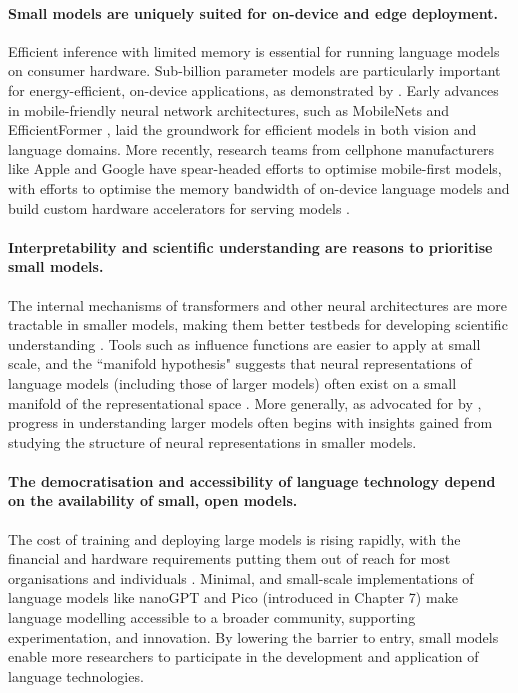 \paragraph{Small models are uniquely suited for on-device and edge deployment.} Efficient inference with limited memory is essential for running language models on consumer hardware. Sub-billion parameter models are particularly important for energy-efficient, on-device applications, as demonstrated by \citet{liu2024mobilellm}. Early advances in mobile-friendly neural network architectures, such as MobileNets \citep{howard2017mobilenets} and EfficientFormer \citep{li2022efficientformer}, laid the groundwork for efficient models in both vision and language domains. More recently, research teams from cellphone manufacturers like Apple and Google have spear-headed efforts to optimise mobile-first models, with efforts to optimise the memory bandwidth of on-device language models \citep{alizadeh2024llm} and build custom hardware accelerators for serving models \citep{deepmind2023gemini}. %
 

\paragraph{Interpretability and scientific understanding are reasons to prioritise small models.} The internal mechanisms of transformers and other neural architectures are more tractable in smaller models, making them better testbeds for developing scientific understanding \citep{elhage2021mathematical, elhage2022toy, anthropic2023components}. Tools such as influence functions are easier to apply at small scale, and the ``manifold hypothesis" suggests that neural representations of language models (including those of larger models) often exist on a small manifold of the representational space \citep{olah2014manifolds}. More generally, as advocated for by \citet{elhage2021mathematical}, progress in understanding larger models often begins with insights gained from studying the structure of neural representations in smaller models.

\paragraph{The democratisation and accessibility of language technology depend on the availability of small, open models.} The cost of training and deploying large models is rising rapidly, with the financial and hardware requirements putting them out of reach for most organisations and individuals \citep{cottier2024rising, sharir2020cost}. Minimal, and small-scale implementations of language models like nanoGPT \citep{karpathy2023nanogpt} and Pico (introduced in Chapter 7) make language modelling accessible to a broader community, supporting experimentation, and innovation. By lowering the barrier to entry, small models enable more researchers to participate in the development and application of language technologies.

